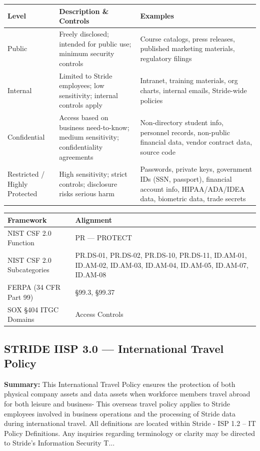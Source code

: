 \documentclass[11pt,landscape]{article}
\begin{document}
\begin{longtable}{|p{2.5cm}|p{4in}|p{3in}|}
\hline
\rowcolor{headgray} \textbf{Level} & \textbf{Description \& Controls} & \textbf{Examples} \\
\hline
Public & Freely disclosed; intended for public use; minimum security controls & Course catalogs, press releases, published marketing materials, regulatory filings \\
\hline
Internal & Limited to Stride employees; low sensitivity; internal controls apply & Intranet, training materials, org charts, internal emails, Stride-wide policies \\
\hline
Confidential & Access based on business need-to-know; medium sensitivity; confidentiality agreements & Non-directory student info, personnel records, non-public financial data, vendor contract data, source code \\
\hline
Restricted / Highly Protected & High sensitivity; strict controls; disclosure risks serious harm & Passwords, private keys, government IDs (SSN, passport), financial account info, HIPAA/ADA/IDEA data, biometric data, trade secrets \\
\hline
\end{longtable}

\begin{tabularx}{\textwidth}{|p{4cm}|X|}
\hline
\rowcolor{headgray} \textbf{Framework} & \textbf{Alignment} \\
\hline
NIST CSF 2.0 Function & PR --- PROTECT \\
\hline
NIST CSF 2.0 Subcategories & PR.DS-01, PR.DS-02, PR.DS-10, PR.DS-11, ID.AM-01, ID.AM-02, ID.AM-03, ID.AM-04, ID.AM-05, ID.AM-07, ID.AM-08 \\
\hline
FERPA (34 CFR Part 99) & §99.3, §99.37 \\
\hline
SOX §404 ITGC Domains & Access Controls \\
\hline
\end{tabularx}


\subsection{\textcolor{strideblue}{STRIDE IISP 3.0} --- International Travel Policy}
\label{pol:IISP30}

\textbf{Summary:} This International Travel Policy ensures the protection of both physical company assets and data assets when workforce members travel abroad for both leisure and business- This overseas travel policy applies to Stride employees involved in business operations and the processing of Stride data during international travel. All definitions are located within Stride - ISP 1.2 -- IT Policy Definitions. Any inquiries regarding terminology or clarity may be directed to Stride’s Information Security T...
\end{document}
